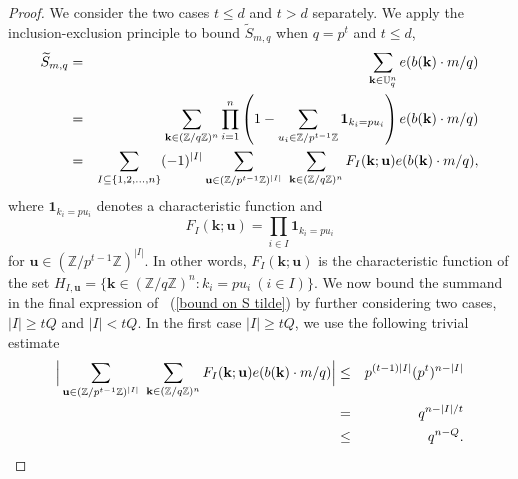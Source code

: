 \documentclass[12pt]{amsart}
\theoremstyle{definition}
\theoremstyle{remark}
\numberwithin{equation}{section}
\begin{document}
\begin{proof}
We consider the two cases $t \leq d$ and $t > d$ separately.
We apply the inclusion-exclusion principle to bound $\widetilde{S}_{ {m}, q }$ when $q = p^t$ and $t \leq d$,
\begin{eqnarray}
\label{bound on S tilde}
\widetilde{S}_{ {m}, q } &=& \sum_{\mathbf{k} \in \mathbb{U}_q^n} e( {b}(\mathbf{k}) \cdot {m}/q )
\\
&=& \sum_{\mathbf{k} \in (\mathbb{Z} / q \mathbb{Z})^n} \prod_{i=1}^n \left( 1 -  \sum_{u_i \in \mathbb{Z} / p^{t-1} \mathbb{Z} } \mathbf{1}_{k_i = p u_i}  \right)
e( {b}(\mathbf{k}) \cdot {m}/q )
\notag
\\
\notag
&=& \sum_{ I \subseteq \{ 1, 2, ..., n \}} (-1)^{|I|}
\sum_{ \mathbf{u} \in  (\mathbb{Z} / p^{t-1} \mathbb{Z} )^{|I|} } \
\sum_{\mathbf{k} \in (\mathbb{Z} / q \mathbb{Z})^n}
F_I(\mathbf{k}; \mathbf{u}) e( {b}(\mathbf{k}) \cdot {m}/q ),
\notag
\end{eqnarray}
where
$\mathbf{1}_{k_i = p u_i}$ denotes a characteristic function and
$$
F_I(\mathbf{k}; \mathbf{u}) = \prod_{i \in I} \mathbf{1}_{k_i = p u_i}
$$
for $\mathbf{u} \in (\mathbb{Z} / p^{t-1} \mathbb{Z})^{|I|}$.
In other words, $F_I(\mathbf{k}; \mathbf{u})$ is the characteristic function of the set $H_{I, \mathbf{u}} = \{ \mathbf{k} \in (\mathbb{Z} / q \mathbb{Z})^{n} : k_i = p u_i \ (i \in I)\}$.
We now bound the summand in the final expression of ~(\ref{bound on S tilde}) by further considering two cases, $|I| \geq t Q$ and $|I| < t Q$.
In the first case $|I| \geq t Q$, we use the following trivial estimate
\begin{eqnarray}
\Big{|} \sum_{ \mathbf{u} \in  (\mathbb{Z} / p^{t-1} \mathbb{Z})^{|I|} } \
\sum_{\mathbf{k} \in (\mathbb{Z} / q \mathbb{Z})^n}
F_I(\mathbf{k}; \mathbf{u}) e( {b}(\mathbf{k}) \cdot {m}/q ) \Big{|}
&\leq&
p^{(t-1) |I|} (p^t)^{n - |I|}
\notag
\\
&=& q^{n - |I|/t}
\notag
\\
&\leq& q^{n - Q}.
\notag
\end{eqnarray}


\end{proof}
\end{document}
